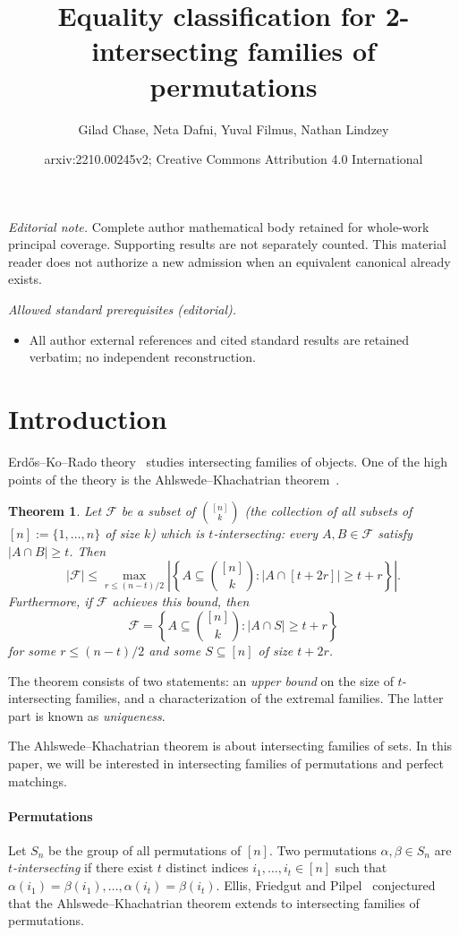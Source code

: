 \documentclass[10pt,a4paper]{amsart}
\title{Equality classification for 2-intersecting families of permutations}
\author{Gilad Chase, Neta Dafni, Yuval Filmus, Nathan Lindzey}
\date{arxiv:2210.00245v2; Creative Commons Attribution 4.0 International}
\newtheorem{theorem}{Theorem}[section]
\theoremstyle{definition}
\begin{document}
\maketitle
\noindent\textit{Editorial note.} Complete author mathematical body retained for whole-work principal coverage. Supporting results are not separately counted. This material reader does not authorize a new admission when an equivalent canonical already exists.\par\medskip
\noindent\textit{Allowed standard prerequisites (editorial).}\begin{itemize}
\item All author external references and cited standard results are retained verbatim; no independent reconstruction.
\end{itemize}\medskip
\section{Introduction} \label{sec:introduction}

Erd\H{o}s--Ko--Rado theory~\cite{EKR} studies intersecting families of objects. One of the high points of the theory is the Ahlswede--Khachatrian theorem~\cite{AK1,AK2}.

\begin{theorem} \label{thm:AK}
Let $\mathcal{F}$ be a subset of $\binom{[n]}{k}$ (the collection of all subsets of $[n] := \{1,\ldots,n\}$ of size $k$) which is \emph{$t$-intersecting}: every $A,B \in \mathcal{F}$ satisfy $|A \cap B| \geq t$. Then
\[
 |\mathcal{F}| \leq \max_{r \leq (n-t)/2} \left|\left\{ A \subseteq \binom{[n]}{k} : |A \cap [t+2r]| \geq t+r \right\}\right|.
\]
Furthermore, if $\mathcal{F}$ achieves this bound, then
\[
 \mathcal{F} = \left\{ A \subseteq \binom{[n]}{k} : |A \cap S| \geq t+r \right\}
\]
for some $r \le (n-t)/2$ and some $S \subseteq [n]$ of size $t + 2r$.
\end{theorem}

The theorem consists of two statements: an \emph{upper bound} on the size of $t$-intersecting families, and a characterization of the extremal families. The latter part is known as \emph{uniqueness}.

The Ahlswede--Khachatrian theorem is about intersecting families of sets.
In this paper, we will be interested in intersecting families of permutations and perfect matchings. 

\paragraph{Permutations}
Let $S_n$ be the group of all permutations of $[n]$. Two permutations $\alpha,\beta \in S_n$ are \emph{$t$-intersecting} if there exist $t$ distinct indices $i_1,\ldots,i_t \in [n]$ such that $\alpha(i_1) = \beta(i_1),\ldots,\alpha(i_t) = \beta(i_t)$. Ellis, Friedgut and Pilpel~\cite{EFP} conjectured that the Ahlswede--Khachatrian theorem extends to intersecting families of permutations.
\end{document}
